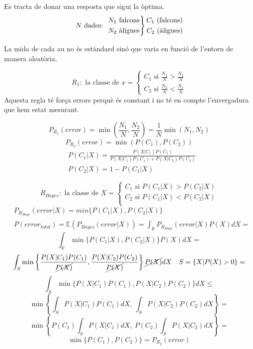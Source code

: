 Es tracta de donar una resposta que sigui la òptima. 
$$
N \text{ dades: }
\begin{rcases*}
N_1 \text{ falcons} \\
N_2 \text{ àligues}
\end{rcases*}
\begin{aligned}
C_1 \text{ (falcons)} \\
C_2 \text{ (àligues)}
\end{aligned}
$$

La mida de cada au no és estàndard sinó que varia en funció de l'entorn de manera aleatòria. 

$$
R_1: \text{ la classe de } x = 
\begin{cases}
C_1 \text{ si } \frac{N_1}{N} > \frac{N_2}{N} \\
C_2 \text{ si } \frac{N_2}{N} < \frac{N_1}{N}
\end{cases}
$$ 
Aquesta regla té força errors perquè és constant i no té en compte l'envergadura que hem estat mesurant.

$$
P_{R_1} (error) = \min\left(\frac{N_1}{N}, \frac{N_2}{N}\right) = \frac{1}{N} \min(N_1, N_2)
$$
$$
P_{R_2} (error) = \min(P(C_1), P(C_2))
$$
\begin{align*}
	& P(C_1 | X) = \frac{P(X|C_1)P(C_1)}{P(X|C_1)P(C_1) + P(X|C_2)P(C_2)} \\
	& P(C_2|X) = 1 - P(C_1|X)
\end{align*}

$$
R_{Bayes}: \text{ la classe de } X =
\begin{cases}
C_1 \text{ si } P(C_1|X) > P(C_2|X) \\
C_2 \text{ si } P(C_1|X) < P(C_2|X) \\
\end{cases}
$$
\begin{align*}
&P_{R_{Bays}} (error|X) = min\{P(C_1|X), P(C_2|X)\} \\
&P(error_{total}) = \mathbb{E}(P_{Bayes} (error|X)) = 
\int_{\mathbb{R}} P_{R_{Bays}} (error|X)P(X)dX =
\end{align*}
$$
\int_{\mathbb{R}} \min\{P(C_1|X),P(C_2|X)\}P(X)dX =
$$
$$
\int_{S} \min\left\{\frac{P(X|C_1)P(C_1)}{\cancel{P(X)}}, \frac{P(X|C_2)P(C_2)}{\cancel{P(X)}}\right\}\cancel{P(X)} dX \quad S = \{X|P(X) > 0\} =
$$
$$
\int_S \min\{ P(X|C_1)P(C_1), P(X|C_2)P(C_2) \} dX \le
$$
$$
\min\left\{ \int_S P(X|C_1)P(C_1) dX,\ \int_S P(X|C_2)P(C_2)dX \right\} =
$$
$$
\min\left\{ P(C_1)\int_S P(X|C_1)dX,\ P(C_2)\int_S P(X|C_2)dX \right\} =
$$
$$
\min \{ P(C_1), P(C_2) \} = P_{R_2} (error)
$$

